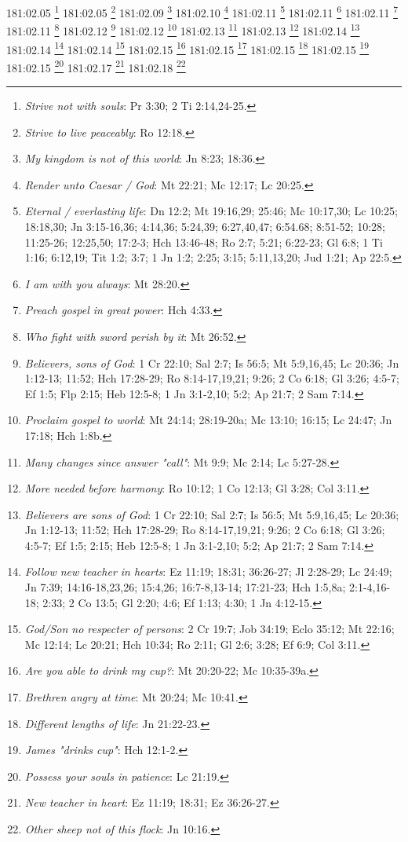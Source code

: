 181:02.05 \footnote{\textit{Strive not with souls}: Pr 3:30; 2 Ti 2:14,24-25.}
181:02.05 \footnote{\textit{Strive to live peaceably}: Ro 12:18.}
181:02.09 \footnote{\textit{My kingdom is not of this world}: Jn 8:23; 18:36.}
181:02.10 \footnote{\textit{Render unto Caesar / God}: Mt 22:21; Mc 12:17; Lc 20:25.}
181:02.11 \footnote{\textit{Eternal / everlasting life}: Dn 12:2; Mt 19:16,29; 25:46; Mc 10:17,30; Lc 10:25; 18:18,30; Jn 3:15-16,36; 4:14,36; 5:24,39; 6:27,40,47; 6:54.68; 8:51-52; 10:28; 11:25-26; 12:25,50; 17:2-3; Hch 13:46-48; Ro 2:7; 5:21; 6:22-23; Gl 6:8; 1 Ti 1:16; 6:12,19; Tit 1:2; 3:7; 1 Jn 1:2; 2:25; 3:15; 5:11,13,20; Jud 1:21; Ap 22:5.}
181:02.11 \footnote{\textit{I am with you always}: Mt 28:20.}
181:02.11 \footnote{\textit{Preach gospel in great power}: Hch 4:33.}
181:02.11 \footnote{\textit{Who fight with sword perish by it}: Mt 26:52.}
181:02.12 \footnote{\textit{Believers, sons of God}: 1 Cr 22:10; Sal 2:7; Is 56:5; Mt 5:9,16,45; Lc 20:36; Jn 1:12-13; 11:52; Hch 17:28-29; Ro 8:14-17,19,21; 9:26; 2 Co 6:18; Gl 3:26; 4:5-7; Ef 1:5; Flp 2:15; Heb 12:5-8; 1 Jn 3:1-2,10; 5:2; Ap 21:7; 2 Sam 7:14.}
181:02.12 \footnote{\textit{Proclaim gospel to world}: Mt 24:14; 28:19-20a; Mc 13:10; 16:15; Lc 24:47; Jn 17:18; Hch 1:8b.}
181:02.13 \footnote{\textit{Many changes since answer "call"}: Mt 9:9; Mc 2:14; Lc 5:27-28.}
181:02.13 \footnote{\textit{More needed before harmony}: Ro 10:12; 1 Co 12:13; Gl 3:28; Col 3:11.}
181:02.14 \footnote{\textit{Believers are sons of God}: 1 Cr 22:10; Sal 2:7; Is 56:5; Mt 5:9,16,45; Lc 20:36; Jn 1:12-13; 11:52; Hch 17:28-29; Ro 8:14-17,19,21; 9:26; 2 Co 6:18; Gl 3:26; 4:5-7; Ef 1:5; 2:15; Heb 12:5-8; 1 Jn 3:1-2,10; 5:2; Ap 21:7; 2 Sam 7:14.}
181:02.14 \footnote{\textit{Follow new teacher in hearts}: Ez 11:19; 18:31; 36:26-27; Jl 2:28-29; Lc 24:49; Jn 7:39; 14:16-18,23,26; 15:4,26; 16:7-8,13-14; 17:21-23; Hch 1:5,8a; 2:1-4,16-18; 2:33; 2 Co 13:5; Gl 2:20; 4:6; Ef 1:13; 4:30; 1 Jn 4:12-15.}
181:02.14 \footnote{\textit{God/Son no respecter of persons}: 2 Cr 19:7; Job 34:19; Eclo 35:12; Mt 22:16; Mc 12:14; Lc 20:21; Hch 10:34; Ro 2:11; Gl 2:6; 3:28; Ef 6:9; Col 3:11.}
181:02.15 \footnote{\textit{Are you able to drink my cup?}: Mt 20:20-22; Mc 10:35-39a.}
181:02.15 \footnote{\textit{Brethren angry at time}: Mt 20:24; Mc 10:41.}
181:02.15 \footnote{\textit{Different lengths of life}: Jn 21:22-23.}
181:02.15 \footnote{\textit{James "drinks cup"}: Hch 12:1-2.}
181:02.15 \footnote{\textit{Possess your souls in patience}: Lc 21:19.}
181:02.17 \footnote{\textit{New teacher in heart}: Ez 11:19; 18:31; Ez 36:26-27.}
181:02.18 \footnote{\textit{Other sheep not of this flock}: Jn 10:16.}
